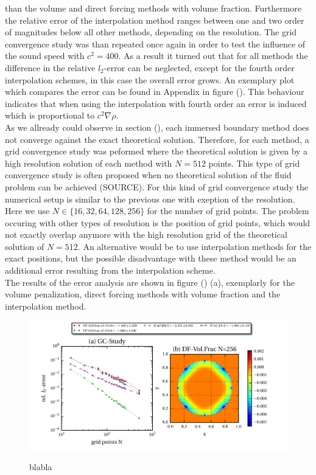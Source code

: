 than the volume and direct forcing methods with volume fraction. Furthermore the relative error of the interpolation method ranges
between one and two order of magnitudes below all other methods, depending on the resolution.
The grid convergence study was than repeated once again in order to test the influence of the sound speed with $c^2 = 400$.
As a result it turned out that for all methods the difference in the relative $l_2$-error can be neglected, except
for the fourth order interpolation schemes, in this case the overall error grows. An exemplary plot which compares
the error can be found in Appendix in figure (). This behaviour indicates that when using the interpolation with fourth order
an error is induced which is proportional to $c^2\nabla \rho$.\\
As we allready could observe in section (), each immersed boundary method does not converge against the exact theoretical solution.
Therefore, for each method, a grid convergence study was peformed where the theoretical solution is given by a
high resolution solution of each method with $N=512$ points. This type of grid convergence study is often proposed
when no theoretical solution of the fluid problem can be achieved (SOURCE).
For this kind of grid convergence study the numerical setup is similar to the previous one with exeption of the resolution.
Here we use $N\in\{16, 32, 64, 128, 256\}$ for the number of grid points.
The problem occuring with other types of resolution is the position of grid points, which would not exactly overlap anymore with
the high resolution grid  of the theoretical solution of $N=512$.
An alternative would be to use interpolation methods for the exact positions, but the possible disadvantage with these method
would be an additional error resulting from the interpolation scheme.\\
The results of the error analysis are shown in figure () (a), exemplarly for the volume penalization, direct forcing  methods with volume fraction
and the interpolation method.

\begin{figure}[!pb]
  \centering
  \includegraphics{gfx/immersed_boundary/hpflow/hd/all.pdf}\label{fig:hpflow_allgc_theo}
  \caption{blabla}
\end{figure}

